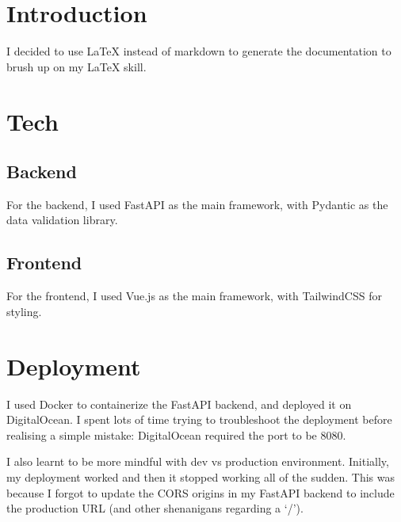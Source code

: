 \documentclass{article}
\begin{document}
\section{Introduction}
I decided to use LaTeX instead of markdown to generate the documentation to brush up on my LaTeX skill.

\section{Tech}
\subsection{Backend}
For the backend, I used FastAPI as the main framework, with Pydantic as the data validation library.

\subsection{Frontend}
For the frontend, I used Vue.js as the main framework, with TailwindCSS for styling.

\section{Deployment}
I used Docker to containerize the FastAPI backend, and deployed it on DigitalOcean. I spent lots of time trying to troubleshoot the deployment before realising a simple mistake: DigitalOcean required the port to be 8080.

I also learnt to be more mindful with dev vs production environment. Initially, my deployment worked and then it stopped working all of the sudden. This was because I forgot to update the CORS origins in my FastAPI backend to include the production URL (and other shenanigans regarding a `/').
\end{document}

